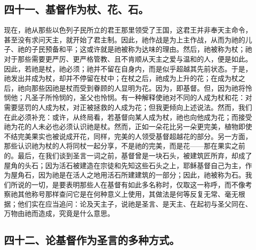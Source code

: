 
\subsection{四十一、基督作为杖、花、石。}

现在，祂从那些以色列子民所立的君王那里领受了王国，这君王并非奉天主命令，甚至没有求问天主，就开始了君主制。因此，祂作战是为上主作战，从而为祂的儿子、祂的子民预备和平；这或许就是祂被称为达味的理由。然后，祂被称为杖；祂对于那些需要更严厉、更严格管教、且不肯顺从天主之爱与温和的人，便是如此。因此，若祂是杖，祂必须；祂并不留在自身内，而是似乎超越其先前状态。于是，祂发出并成为杖，却并不停留在杖中；在杖之后，祂成为上升的花；在成为杖之后，祂向那些因祂是杖而受到眷顾的人显明为花。因为，即基督。但，因为祂将怜悯他；凡圣子所怜悯的，圣父也怜悯。有一种解释使祂对不同的人成为杖和花：对需要惩罚的人成为杖，对正被拯救的人成为花；但我更倾向上述说法。然而，我们在此必须补充：或许，从终局看，若基督向某人成为杖，祂也向他成为花；而接受祂为花的人未必也必须认识祂是杖。然而，正如一朵花比另一朵更完美，植物即使不结完美果实也被说成开花，同样，完美的人领受基督超越花的部分。另一方面，那些认识祂为杖的人将同杖一起分享，不是祂的完美，而是花——那在果实之前的。最后，在我们谈到圣言一词之前，基督曾是一块石头，被建筑匠所弃，却成了屋角的头石；因为活石被建造在宗徒和先知这些石头之上，耶稣基督自己为主，作为屋角石，因为祂是在活人之地用活石所建建筑的一部分；因此，祂被称为石。我们所说的一切，是要表明那些人在基督有如此多名称时，仅取这一称呼，而不像考察祂其他称号那样查问它是在何种意义上使用，其做法是何等反复无常、毫无根据；他们实在应当追问：论及天主子，说祂是圣言、是天主、在起初与圣父同在、万物由祂而造成，究竟是什么意思。\par


\subsection{四十二、论基督作为圣言的多种方式。}

